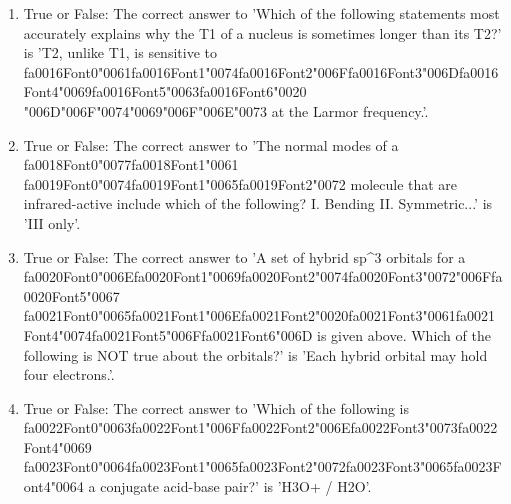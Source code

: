 \documentclass[12pt]{article}
\begin{document}
\begin{enumerate}[label=\arabic*.]
\item True or False: The correct answer to 'Which of the following statements most accurately explains why the T1 of a nucleus is sometimes longer than its T2?' is 'T2, unlike T1, is sensitive to {\csname fa0016Font0\endcsname\char"0061}{\csname fa0016Font1\endcsname\char"0074}{\csname fa0016Font2\endcsname\char"006F}{\csname fa0016Font3\endcsname\char"006D}{\csname fa0016Font4\endcsname\char"0069}{\csname fa0016Font5\endcsname\char"0063}{\csname fa0016Font6\endcsname\char"0020} {\char"006D}{\char"006F}{\char"0074}{\char"0069}{\char"006F}{\char"006E}{\char"0073} at the Larmor frequency.'.
\item True or False: The correct answer to 'The normal modes of a {\csname fa0018Font0\endcsname\char"0077}{\csname fa0018Font1\endcsname\char"0061} {\csname fa0019Font0\endcsname\char"0074}{\csname fa0019Font1\endcsname\char"0065}{\csname fa0019Font2\endcsname\char"0072} molecule that are infrared-active include which of the following? I. Bending II. Symmetric...' is 'III only'.
\item True or False: The correct answer to 'A set of hybrid sp\^{}3 orbitals for a {\csname fa0020Font0\endcsname\char"006E}{\csname fa0020Font1\endcsname\char"0069}{\csname fa0020Font2\endcsname\char"0074}{\csname fa0020Font3\endcsname\char"0072}{\char"006F}{\csname fa0020Font5\endcsname\char"0067} {\csname fa0021Font0\endcsname\char"0065}{\csname fa0021Font1\endcsname\char"006E}{\csname fa0021Font2\endcsname\char"0020}{\csname fa0021Font3\endcsname\char"0061}{\csname fa0021Font4\endcsname\char"0074}{\csname fa0021Font5\endcsname\char"006F}{\csname fa0021Font6\endcsname\char"006D} is given above. Which of the following is NOT true about the orbitals?' is 'Each hybrid orbital may hold four electrons.'.
\item True or False: The correct answer to 'Which of the following is {\csname fa0022Font0\endcsname\char"0063}{\csname fa0022Font1\endcsname\char"006F}{\csname fa0022Font2\endcsname\char"006E}{\csname fa0022Font3\endcsname\char"0073}{\csname fa0022Font4\endcsname\char"0069} {\csname fa0023Font0\endcsname\char"0064}{\csname fa0023Font1\endcsname\char"0065}{\csname fa0023Font2\endcsname\char"0072}{\csname fa0023Font3\endcsname\char"0065}{\csname fa0023Font4\endcsname\char"0064} a conjugate acid-base pair?' is 'H3O+ / H2O'.

\end{enumerate}
\end{document}
